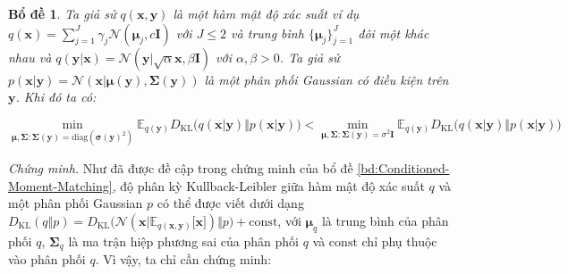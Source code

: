 \documentclass[14pt, a4paper]{article}
\numberwithin{equation}{section}
\numberwithin{figure}{section}
\newtheorem{bd}{Bổ đề}
\numberwithin{dl}{section}
\numberwithin{md}{section}
\numberwithin{bd}{section}
\numberwithin{dn}{section}
\numberwithin{hq}{section}
\begin{document}
    \begin{bd} \label{bd:Mixture-Gaussian-Data-Distribution}
        Ta giả sử $q(\boldsymbol{x}, \boldsymbol{y})$ là một hàm mật độ xác suất ví dụ $q(\boldsymbol{x})=\sum_{j=1}^J \gamma_j \mathcal{N} (\boldsymbol{\mu}_j, c \boldsymbol{I})$ với $J \leq 2$ và trung bình $\lbrace \boldsymbol{\mu}_j \rbrace_{j=1}^J$ đôi một khác nhau và $q(\boldsymbol{y} \vert \boldsymbol{x})=\mathcal{N}(\boldsymbol{y} \vert \sqrt{\alpha} \boldsymbol{x}, \beta \boldsymbol{I})$ với $\alpha, \beta > 0$. Ta giả sử $p(\boldsymbol{x} \vert \boldsymbol{y}) = \mathcal{N} (\boldsymbol{x} \vert \boldsymbol{\mu}(\boldsymbol{y}), \boldsymbol{\Sigma}(\boldsymbol{y}))$ là một phân phối Gaussian có điều kiện trên $\boldsymbol{y}$.
        Khi đó ta có:

        \begin{equation}
            \min_{\boldsymbol{\mu}, \boldsymbol{\Sigma}:\boldsymbol{\Sigma}(\boldsymbol{y})=\mathrm{diag}(\boldsymbol{\sigma} (\boldsymbol{y})^2)} \mathbb{E}_{q(\boldsymbol{y})} D_{\mathrm{KL}} \big( q(\boldsymbol{x} \vert \boldsymbol{y}) \Vert p(\boldsymbol{x} \vert \boldsymbol{y}) \big) < \min_{\boldsymbol{\mu}, \boldsymbol{\Sigma}:\boldsymbol{\Sigma}(\boldsymbol{y})=\sigma^2 \boldsymbol{I}} \mathbb{E}_{q(\boldsymbol{y})} D_{\mathrm{KL}} \big( q(\boldsymbol{x} \vert \boldsymbol{y}) \Vert p(\boldsymbol{x} \vert \boldsymbol{y}) \big)
        \end{equation}
    \end{bd}

    \textit{Chứng minh.}
    Như đã được đề cập trong chứng minh của bổ đề \ref{bd:Conditioned-Moment-Matching}, độ phân kỳ Kullback-Leibler giữa hàm mật độ xác suất $q$ và một phân phối Gaussian $p$ có thể được viết dưới dạng $D_{\mathrm{KL}} (q \Vert p) = D_{\mathrm{KL}} \big( \mathcal{N}(\boldsymbol{x} \vert \mathbb{E}_{q(\boldsymbol{x}, \boldsymbol{y})} \lbrack \boldsymbol{x} \rbrack) \Vert p \big) + \mathrm{const}$, với $\boldsymbol{\mu}_q$ là trung bình của phân phối $q$, $\boldsymbol{\Sigma}_q$ là ma trận hiệp phương sai của phân phối $q$ và $\mathrm{const}$ chỉ phụ thuộc vào phân phối $q$.
    Vì vậy, ta chỉ cần chứng minh:
\end{document}
